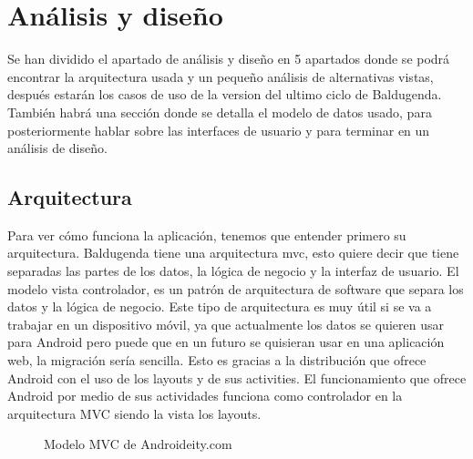\section{Análisis y diseño}
\label{secc:análisis y diseño}
Se han dividido el apartado de análisis y diseño en 5 apartados donde se podrá encontrar la arquitectura usada y un pequeño análisis de alternativas vistas, después estarán los casos de uso de la version del ultimo ciclo de Baldugenda. También habrá una sección donde se detalla el modelo de datos usado, para posteriormente hablar sobre las interfaces de usuario y para terminar en un análisis de diseño. 
\subsection{Arquitectura}
\label{subsecc:arquitectura}

Para ver cómo funciona la aplicación, tenemos que entender primero su arquitectura. Baldugenda tiene una arquitectura \acrshort{mvc}, esto quiere decir que tiene separadas las partes de los datos, la lógica de negocio y la interfaz de usuario.
El modelo vista controlador, es un patrón de arquitectura de software que separa los datos y la lógica de negocio. Este tipo de arquitectura es muy útil si se va a trabajar en un dispositivo móvil, ya que actualmente los datos se quieren usar para Android pero puede que en un futuro se quisieran usar en una aplicación web, la migración sería sencilla. Esto es gracias a la distribución que ofrece Android con el uso de los layouts y de sus activities.
El funcionamiento que ofrece Android por medio de sus actividades funciona como controlador en la arquitectura MVC siendo la vista los layouts.

\begin{figure}[H] 
  \begin{center} 
    \caption{Modelo MVC de Androideity.com} 
    \label{fig:ModeloMVC} 
  \end{center} 
\end{figure}

